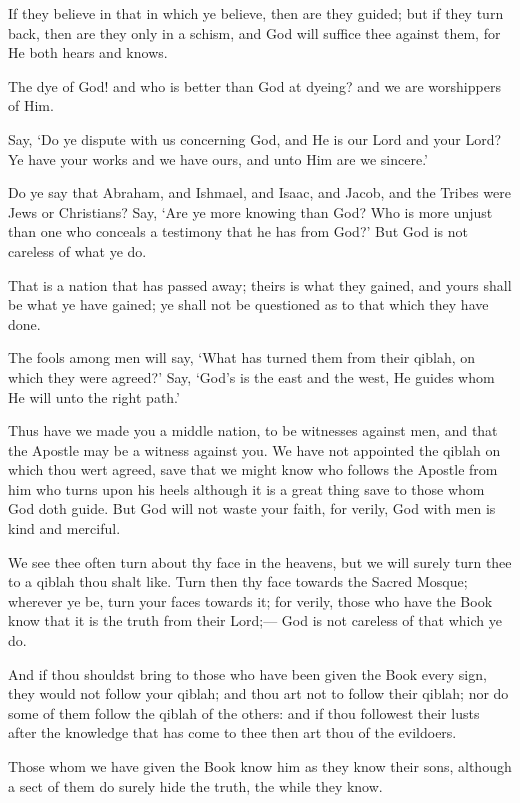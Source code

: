 \documentclass[fontsize=14pt, letterpaper, notitlepage, openany, DIV=12]{scrbook} %
\begin{document}
\noindent[2:137]
If they believe in that in which ye believe, then are they guided; but if they turn back,
then are they only in a schism, and God will suffice thee against them, for He both hears and
knows.

\noindent[2:138]
The dye of God! and who is better than God at dyeing? and we are worshippers of Him.

\noindent[2:139]
Say, `Do ye dispute with us concerning God, and He is our Lord and your Lord? Ye have
your works and we have ours, and unto Him are we sincere.'

\noindent[2:140]
Do ye say that Abraham, and Ishmael, and Isaac, and Jacob, and the Tribes were Jews or
Christians? Say, `Are ye more knowing than God? Who is more unjust than one who conceals a
testimony that he has from God?' But God is not careless of what ye do.

\noindent[2:141]
That is a nation that has passed away; theirs is what they gained, and yours shall be what
ye have gained; ye shall not be questioned as to that which they have done.

\noindent[2:142]
The fools among men will say, `What has turned them from their qiblah, on which they
were agreed?' Say, `God's is the east and the west, He guides whom He will unto the right path.'

\noindent[2:143]
Thus have we made you a middle nation, to be witnesses against men, and that the
Apostle may be a witness against you. We have not appointed the qiblah on which thou wert
agreed, save that we might know who follows the Apostle from him who turns upon his heels
although it is a great thing save to those whom God doth guide. But God will not waste your
faith, for verily, God with men is kind and merciful.

\noindent[2:144]
We see thee often turn about thy face in the heavens, but we will surely turn thee to a
qiblah thou shalt like. Turn then thy face towards the Sacred Mosque; wherever ye be, turn your
faces towards it; for verily, those who have the Book know that it is the truth from their Lord;---
God is not careless of that which ye do.

\noindent[2:145]
And if thou shouldst bring to those who have been given the Book every sign, they would
not follow your qiblah; and thou art not to follow their qiblah; nor do some of them follow the
qiblah of the others: and if thou followest their lusts after the knowledge that has come to thee
then art thou of the evildoers.

\noindent[2:146]
Those whom we have given the Book know him as they know their sons, although a sect
of them do surely hide the truth, the while they know.
\end{document}
